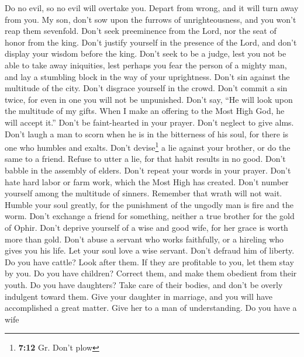  Do no evil, so no evil will overtake you. 
Depart from wrong, and it will turn away from you.  My
son, don't sow upon the furrows of unrighteousness, and you won't reap
them sevenfold.  Don't seek preeminence from the Lord, nor
the seat of honor from the king.  Don't justify yourself
in the presence of the Lord, and don't display your wisdom before the
king.  Don't seek to be a judge, lest you not be able to
take away iniquities, lest perhaps you fear the person of a mighty man,
and lay a stumbling block in the way of your uprightness. 
Don't sin against the multitude of the city. Don't disgrace yourself in
the crowd.  Don't commit a sin twice, for even in one you
will not be unpunished.  Don't say, ``He will look upon
the multitude of my gifts. When I make an offering to the Most High God,
he will accept it.''  Don't be faint-hearted in your
prayer. Don't neglect to give alms.  Don't laugh a man to
scorn when he is in the bitterness of his soul, for there is one who
humbles and exalts.  Don't devise\footnote{\textbf{7:12}
  Gr. Don't plow} a lie against your brother, or do the same to a
friend.  Refuse to utter a lie, for that habit results in
no good.  Don't babble in the assembly of elders. Don't
repeat your words in your prayer.  Don't hate hard labor
or farm work, which the Most High has created.  Don't
number yourself among the multitude of sinners. Remember that wrath will
not wait.  Humble your soul greatly, for the punishment
of the ungodly man is fire and the worm.  Don't exchange
a friend for something, neither a true brother for the gold of Ophir.
 Don't deprive yourself of a wise and good wife, for her
grace is worth more than gold.  Don't abuse a servant who
works faithfully, or a hireling who gives you his life. 
Let your soul love a wise servant. Don't defraud him of liberty.
 Do you have cattle? Look after them. If they are
profitable to you, let them stay by you.  Do you have
children? Correct them, and make them obedient from their youth.
 Do you have daughters? Take care of their bodies, and
don't be overly indulgent toward them.  Give your
daughter in marriage, and you will have accomplished a great matter.
Give her to a man of understanding.  Do you have a wife

